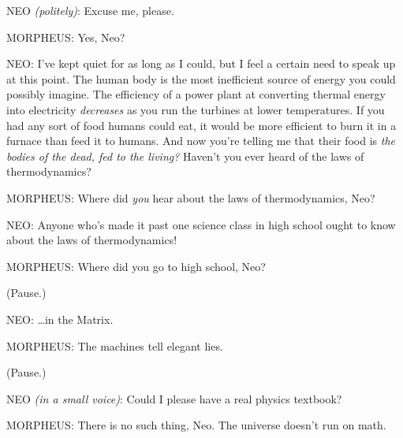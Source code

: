 NEO \emph{(politely)}: Excuse me, please.

MORPHEUS: Yes, Neo?

NEO: I've kept quiet for as long as I could, but I feel a certain need to speak 
up at this point. The human body is the most inefficient source of energy you 
could possibly imagine. The efficiency of a power plant at converting thermal 
energy into electricity \emph{decreases} as you run the turbines at lower 
temperatures. If you had any sort of food humans could eat, it would be more 
efficient to burn it in a furnace than feed it to humans. And now you're 
telling me that their food is \emph{the bodies of the dead, fed to the living?} 
Haven't you ever heard of the laws of thermodynamics?

MORPHEUS: Where did \emph{you} hear about the laws of thermodynamics, Neo?

NEO: Anyone who's made it past one science class in high school ought to know 
about the laws of thermodynamics!

MORPHEUS: Where did you go to high school, Neo?

(Pause.)

NEO: {\ldots}in the Matrix.

MORPHEUS: The machines tell elegant lies.

(Pause.)

NEO \emph{(in a small voice)}: Could I please have a real physics textbook?

MORPHEUS: There is no such thing, Neo. The universe doesn't run on math.
